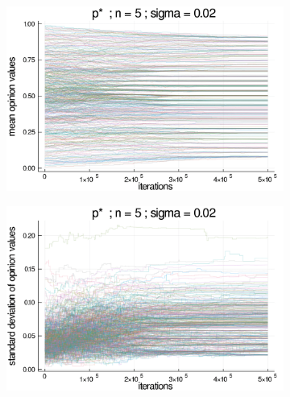 \documentclass{article}
\begin{document}
    \begin{figure}[H]
      \centering
      \begin{subfigure}[b]{0.48\textwidth}
        \includegraphics[width=\textwidth]{img/series/tseries5/Poodlcalculatepsn5-rho10e-5-sigma002-00intransrandom.png}
      \end{subfigure}
      \begin{subfigure}[b]{0.48\textwidth}
        \includegraphics[width=\textwidth]{img/series/tseries5/Poodlcalculatepsn5-rho10e-5-sigma002-00intransrandom-std.png}
        \end{subfigure}
      \begin{subfigure}[b]{0.48\textwidth}

\end{subfigure}
\end{figure}
\end{document}
